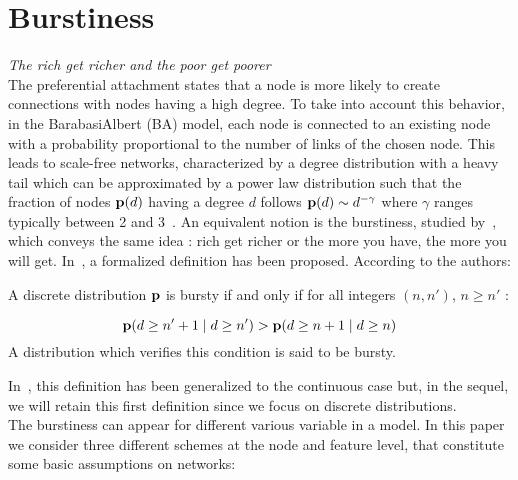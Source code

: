 \section{Burstiness}
\emph{The rich get richer and the poor get poorer} ~\\


The preferential attachment states that a node is more likely to create connections with nodes having a high degree. To take into account this behavior, in the BarabasiAlbert (BA) model, each node is connected to an existing node with a probability proportional to the number of links of the chosen node. This leads to scale-free networks, characterized by a degree distribution with a heavy tail which can be approximated by a power law distribution such that the fraction of nodes $\mathbf{p}(d)$ having a degree $d$ follows $\mathbf{p}(d) \sim d^{-\gamma}$ where $\gamma$ ranges typically between 2 and 3~\cite{barabasi1999emergence}. An equivalent notion is the burstiness, studied by~\cite{church1995poisson}, which conveys the same idea : rich get richer or the more you have, the more you will get. In~\cite{clinchant2008bnb}, a formalized definition has been proposed. According to the authors:

\begin{definition}[Burstiness]
	A discrete distribution $\mathbf{p}$ is bursty if and only if for all integers $(n, n')$, $n \geq n'$ :
	
	\begin{equation}
	\mathbf{p}(d \geq n'+1 \mid d \geq n') > \mathbf{p}(d \geq n+1 \mid d \geq n) 
	\end{equation}
	 A distribution which verifies this condition is said to be bursty.
\end{definition}

In~\cite{clinchant2010information}, this definition has been generalized to the continuous case but, in the sequel, we will retain this first definition since we focus on discrete distributions.~\\

The burstiness can appear for different various variable in a model. In this paper we consider three different schemes at the node and feature level, that constitute some basic assumptions on networks:

